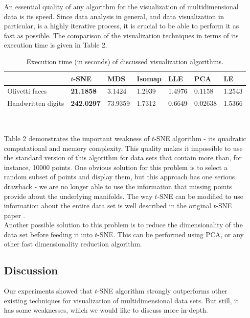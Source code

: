 An essential quality of any algorithm for the visualization of multidimensional data is its speed. Since data analysis in general, and data visualization in particular, is a highly iterative process, it is crucial to be able to perform it as fast as possible. The comparison of the visualization techniques in terms of its execution time is given in Table 2.\\

\begin{table}[H]
	\centering
	\begin{tabular}{| l | l | l | l | l | l | l |} 
		\hline
		\quad & $t$-SNE & MDS & Isomap & LLE & PCA & LE \\
		\hline			
		Olivetti faces & \textbf{21.1858} & 3.1424 & 1.2939 & 1.4976 & 0.1158 & 1.2543 \\
		Handwritten digits & \textbf{242.0297} & 73.9359 & 1.7312 & 0.6649 & 0.02638 & 1.5366 \\
		\hline  
	\end{tabular}\\
	\caption{Execution time (in seconds) of discussed visualization algorithms.}
\end{table}

Table 2 demonstrates the important weakness of $t$-SNE algorithm - its quadratic computational and memory complexity. This quality makes it impossible to use the standard version of this algorithm for data sets that contain more than, for instance, 10000 points. One obvious solution for this problem is to select a random subset of points and display them, but this approach has one serious drawback - we are no longer able to use the information that missing points provide about the underlying manifolds. The way $t$-SNE can be modified to use information about the entire data set is well described in the original $t$-SNE paper \cite{tsnearticle}.\\

Another possible solution to this problem is to reduce the dimensionality of the data set before feeding it into $t$-SNE. This can be performed using PCA, or any other fast dimensionality reduction algorithm.

\subsection{Discussion}

Our experiments showed that $t$-SNE algorithm strongly outperforms other existing techniques for visualization of multidimensional data sets. But still, it has some weaknesses, which we would like to discuss more in-depth.\\

